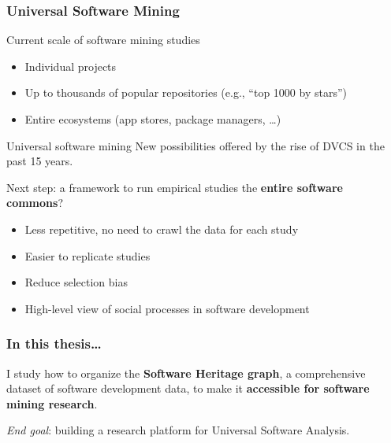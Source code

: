 \documentclass[aspectratio=169,xcolor=table]{beamer}
\begin{document}
    \begin{frame}
        \frametitle{Universal Software Mining}

        \begin{block}{Current scale of software mining studies}
            \begin{itemize}
                \item Individual projects
                \item Up to thousands of popular repositories (e.g., ``top
                    1000 by stars'')
                \item Entire ecosystems (app stores, package managers, …)
            \end{itemize}
        \end{block}

        \begin{block}{Universal software mining}
            New possibilities offered by the rise of DVCS in the past 15 years.

            Next step: a framework to run empirical studies the
            \textbf{entire software commons}?

            \begin{itemize}
                \item Less repetitive, no need to crawl the data for each study
                \item Easier to replicate studies
                \item Reduce selection bias
                \item High-level view of social processes in software
                    development
            \end{itemize}
        \end{block}
    \end{frame}

    \begin{frame}
        \frametitle{In this thesis…}

        \begin{block}{}
            I study how to organize the \textbf{Software Heritage graph}, a
            comprehensive dataset of software development data, to make it
            \textbf{accessible for software mining research}.
        \end{block}

        \begin{block}{}
            \emph{End goal}: building a research platform for Universal
            Software Analysis.
        \end{block}
    \end{frame}
\end{document}
